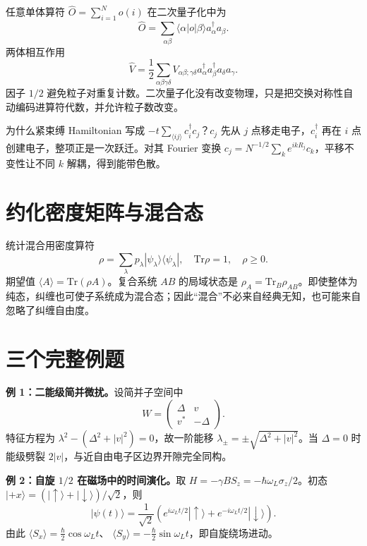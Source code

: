 任意单体算符
$\hat O=\sum_{i=1}^N o(i)$ 在二次量子化中为
\[
\boxed{\hat O=\sum_{\alpha\beta}
\langle\alpha|o|\beta\rangle a_\alpha^\dagger a_\beta}.
\]
两体相互作用
\[
\boxed{\hat V=\frac12\sum_{\alpha\beta\gamma\delta}
V_{\alpha\beta;\gamma\delta}
a_\alpha^\dagger a_\beta^\dagger a_\delta a_\gamma}.
\]
因子 $1/2$ 避免粒子对重复计数。二次量子化没有改变物理，只是把交换对称性自动编码进算符代数，并允许粒子数改变。

\begin{whybox}
为什么紧束缚 Hamiltonian 写成
$-t\sum_{\langle ij\rangle}c_i^\dagger c_j$？$c_j$ 先从 $j$ 点移走电子，$c_i^\dagger$ 再在 $i$ 点创建电子，整项正是一次跃迁。对其 Fourier 变换
$c_j=N^{-1/2}\sum_k e^{ikR_j}c_k$，平移不变性让不同 $k$ 解耦，得到能带色散。
\end{whybox}

\section{约化密度矩阵与混合态}
统计混合用密度算符
\[
\rho=\sum_\lambda p_\lambda|\psi_\lambda\rangle\langle\psi_\lambda|,
\quad \mathrm{Tr}\rho=1,\quad \rho\ge0.
\]
期望值 $\langle A\rangle=\mathrm{Tr}(\rho A)$。复合系统 $AB$ 的局域状态是
$\rho_A=\mathrm{Tr}_B\rho_{AB}$。即使整体为纯态，纠缠也可使子系统成为混合态；因此“混合”不必来自经典无知，也可能来自忽略了纠缠自由度。

\section{三个完整例题}
\begin{examplebox}
\textbf{例 1：二能级简并微扰。}设简并子空间中
\[
W=\begin{pmatrix}\Delta&v\\v^*&-\Delta\end{pmatrix}.
\]
特征方程为 $\lambda^2-(\Delta^2+|v|^2)=0$，故一阶能移
$\lambda_\pm=\pm\sqrt{\Delta^2+|v|^2}$。当 $\Delta=0$ 时能级劈裂
$2|v|$，与近自由电子区边界开隙完全同构。
\end{examplebox}

\begin{examplebox}
\textbf{例 2：自旋 $1/2$ 在磁场中的时间演化。}取
$H=-\gamma B S_z=-\hbar\omega_L\sigma_z/2$。初态
$|+x\rangle=(|\uparrow\rangle+|\downarrow\rangle)/\sqrt2$，则
\[
|\psi(t)\rangle=\frac1{\sqrt2}
(e^{i\omega_Lt/2}|\uparrow\rangle+
e^{-i\omega_Lt/2}|\downarrow\rangle).
\]
由此 $\langle S_x\rangle=\frac\hbar2\cos\omega_Lt$、
$\langle S_y\rangle=-\frac\hbar2\sin\omega_Lt$，即自旋绕场进动。
\end{examplebox}

